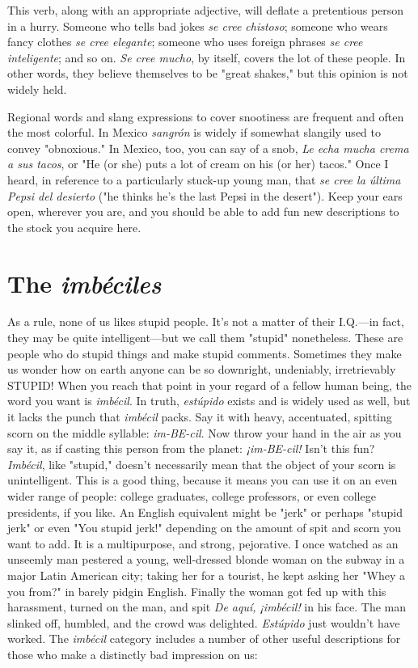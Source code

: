\documentclass[14pt,a4paper,oneside]{memoir}
\newcommand{\bsk}{\vspace{20pt}}
\begin{document}
This verb, along with an appropriate adjective, will
deflate a pretentious person in a hurry. Someone who tells bad jokes
\emph{se cree chistoso}; someone who wears fancy clothes \emph{se cree elegante};
someone who uses foreign phrases \emph{se cree inteligente}; and so on. \emph{Se
	cree mucho}, by itself, covers the lot of these people. In other words,
they believe themselves to be "great shakes," but this opinion is not
widely held.

\bsk

Regional words and slang expressions to cover snootiness are
frequent and often the most colorful. In Mexico \emph{sangrón} is widely if
somewhat slangily used to convey "obnoxious." In Mexico, too, you
can say of a snob, \emph{Le echa mucha crema a sus tacos}, or "He (or she)
puts a lot of cream on his (or her) tacos." Once I heard, in reference to
a particularly stuck-up young man, that \emph{se cree la última Pepsi del
	desierto} ("he thinks he's the last Pepsi in the desert"). Keep your ears
open, wherever you are, and you should be able to add fun new descriptions to the stock you acquire here.

\section{The \emph{imbéciles}}

As a rule, none of us likes stupid people. It's not a matter of
their I.Q.---in fact, they may be quite intelligent---but we call them
"stupid" nonetheless. These are people who do stupid things and make
stupid comments. Sometimes they make us wonder how on earth anyone can be so downright, undeniably, irretrievably STUPID!
When you reach that point in your regard of a fellow human
being, the word you want is \emph{imbécil}. In truth, \emph{estúpido} exists and is
widely used as well, but it lacks the punch that \emph{imbécil} packs. Say it
with heavy, accentuated, spitting scorn on the middle syllable: \emph{im-BE-cil}. Now throw your hand in the air as you say it, as if casting this
person from the planet: \emph{¡im-BE-cil!} Isn't this fun?
\emph{Imbécil}, like "stupid," doesn't necessarily mean that the object of your scorn is unintelligent. This is a good thing, because it
means you can use it on an even wider range of people: college graduates, college professors, or even college presidents, if you like. An English equivalent might be "jerk" or perhaps "stupid jerk" or even "You
stupid jerk!" depending on the amount of spit and scorn you want to
add. It is a multipurpose, and strong, pejorative. I once watched as an
unseemly man pestered a young, well-dressed blonde woman on the
subway in a major Latin American city; taking her for a tourist, he
kept asking her "Whey a you from?" in barely pidgin English. Finally
the woman got fed up with this harassment, turned on the man, and
spit \emph{De aquí, ¡imbécil!} in his face. The man slinked off, humbled, and
the crowd was delighted. \emph{Estúpido} just wouldn't have worked.
The \emph{imbécil} category includes a number of other useful descriptions for those who make a distinctly bad impression on us:
\end{document}
